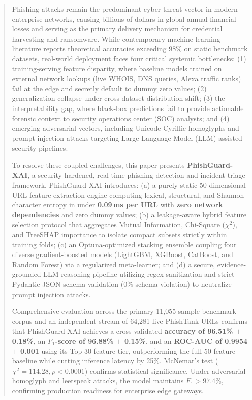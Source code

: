 \documentclass[conference]{IEEEtran}
\begin{document}
\begin{abstract}
Phishing attacks remain the predominant cyber threat vector in modern enterprise networks, causing billions of dollars in global annual financial losses and serving as the primary delivery mechanism for credential harvesting and ransomware. While contemporary machine learning literature reports theoretical accuracies exceeding 98\% on static benchmark datasets, real-world deployment faces four critical systemic bottlenecks: (1) training-serving feature disparity, where baseline models trained on external network lookups (live WHOIS, DNS queries, Alexa traffic ranks) fail at the edge and secretly default to dummy zero values; (2) generalization collapse under cross-dataset distribution shift; (3) the interpretability gap, where black-box predictions fail to provide actionable forensic context to security operations center (SOC) analysts; and (4) emerging adversarial vectors, including Unicode Cyrillic homoglyphs and prompt injection attacks targeting Large Language Model (LLM)-assisted security pipelines.

To resolve these coupled challenges, this paper presents \textbf{PhishGuard-XAI}, a security-hardened, real-time phishing detection and incident triage framework. PhishGuard-XAI introduces: (a) a purely static 50-dimensional URL feature extraction engine computing lexical, structural, and Shannon character entropy in under \textbf{0.09\,ms per URL} with \textbf{zero network dependencies} and zero dummy values; (b) a leakage-aware hybrid feature selection protocol that aggregates Mutual Information, Chi-Square ($\chi^2$), and TreeSHAP importance to isolate compact subsets strictly within training folds; (c) an Optuna-optimized stacking ensemble coupling four diverse gradient-boosted models (LightGBM, XGBoost, CatBoost, and Random Forest) via a regularized meta-learner; and (d) a secure, evidence-grounded LLM reasoning pipeline utilizing regex sanitization and strict Pydantic JSON schema validation (0\% schema violation) to neutralize prompt injection attacks.

Comprehensive evaluation across the primary 11,055-sample benchmark corpus and an independent stream of 64,281 live PhishTank URLs confirms that PhishGuard-XAI achieves a cross-validated \textbf{accuracy of 96.51\% $\pm$ 0.18\%}, an \textbf{$F_1$-score of 96.88\% $\pm$ 0.15\%}, and an \textbf{ROC-AUC of 0.9954 $\pm$ 0.001} using its Top-30 feature tier, outperforming the full 50-feature baseline while cutting inference latency by 25\%. McNemar's test ($\chi^2 = 114.28, p < 0.0001$) confirms statistical significance. Under adversarial homoglyph and leetspeak attacks, the model maintains $F_1 > 97.4\%$, confirming production readiness for enterprise edge gateways.
\end{abstract}
\end{document}
